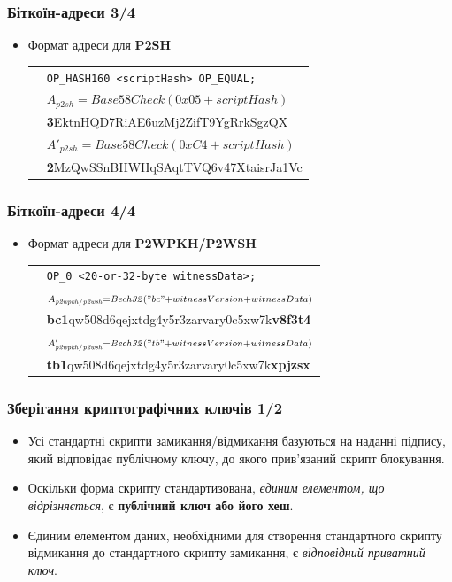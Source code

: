 \documentclass{beamer}
\begin{document}
\begin{frame}
  \frametitle{Біткоїн-адреси 3/4}
  \begin{itemize}
  \item Формат адреси для \textbf{P2SH}
    \break
    \begin{tabular}{rl}
      &\tiny\texttt{OP_HASH160 <scriptHash> OP_EQUAL;} \\
      &${\scriptstyle A_{\mathit{p2sh}} = \mathit{Base58Check}(0x05 +
        scriptHash)}$ \\
      &{\scriptsize \quad\quad\quad \textbf{3}EktnHQD7RiAE6uzMj2ZifT9YgRrkSgzQX} \\
      &${\scriptstyle A'_{\mathit{p2sh}} = \mathit{Base58Check}(0xC4 +
        scriptHash)}$ \\
      &{\scriptsize \quad\quad\quad \textbf{2}MzQwSSnBHWHqSAqtTVQ6v47XtaisrJa1Vc} \\
    \end{tabular}
  \end{itemize}
\end{frame}

\begin{frame}
  \frametitle{Біткоїн-адреси 4/4}
  \begin{itemize}
  \item Формат адреси для \textbf{P2WPKH/P2WSH}
    \break
    \begin{tabular}{rl}
      &\tiny\texttt{OP_0 <20-or-32-byte witnessData>;} \\
      &${\scriptstyle A_{\mathit{p2wpkh/p2wsh}} = \mathit{Bech32}("bc" +
        witnessVersion + witnessData)}$ \\
      &{\scriptsize \quad\quad\quad \textbf{bc1}qw508d6qejxtdg4y5r3zarvary0c5xw7k\textbf{v8f3t4}} \\
      &${\scriptstyle A'_{\mathit{p2wpkh/p2wsh}} = \mathit{Bech32}("tb" +
        witnessVersion + witnessData)}$ \\
      &{\scriptsize \quad\quad\quad \textbf{tb1}qw508d6qejxtdg4y5r3zarvary0c5xw7k\textbf{xpjzsx}} \\
    \end{tabular}
  \end{itemize}
\end{frame}

\begin{frame}
  \frametitle{Зберігання криптографічних ключів 1/2}
  \begin{itemize}
  \item Усі стандартні скрипти замикання/відмикання базуються на наданні
    підпису, який відповідає публічному ключу, до якого прив'язаний скрипт
    блокування.
  \item Оскільки форма скрипту стандартизована, \textit{єдиним елементом, що
      відрізняється}, є \textbf{публічний ключ або його хеш}.
  \item Єдиним елементом даних, необхідними для створення стандартного скрипту
    відмикання до стандартного скрипту замикання, є \textit{відповідний
      приватний ключ}.
  \end{itemize}
\end{frame}
\end{document}
